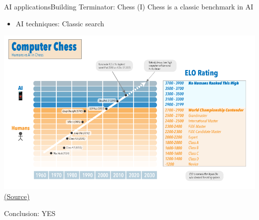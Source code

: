 \documentclass[10pt,compress]{beamer} %
\begin{document}
\begin{frame}{AI applications}{Building Terminator: Chess (I)}
	Chess is a classic benchmark in AI
	\begin{itemize}
		\item AI techniques: Classic search
	\end{itemize}

	\vspace{-0.4cm}

	\begin{center}
		\includegraphics[width=0.7\linewidth]{figs/elo.png}\\
		\tiny{\href{http://www.statisticsviews.com/details/feature/8791241/Artificial-Intelligence-Solving-the-Chinese-Room-Argument.html}{(Source)}}
	\end{center}

	\vspace{-0.6cm}

	Conclusion: YES
\end{frame}
\end{document}
